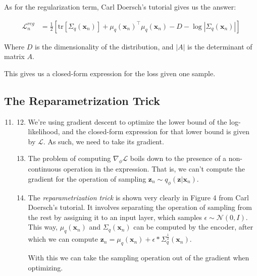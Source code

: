 \documentclass{article}
\begin{document}
\begin{enumerate}[label=\textbf{1.\arabic*}]
  As for the regularization term, Carl Doersch's tutorial gives us the answer:

  \begin{align*}
    \mathcal{L}_n^{reg} &= \frac{1}{2} \left[ \text{tr} \left[ \Sigma_q(\bm{x}_n) \right] + \mu_q(\bm{x}_n)^{\top} \mu_q(\bm{x}_n) - D - \log |\Sigma_q(\bm{x}_n)| \right]
  \end{align*}

  Where $D$ is the dimensionality of the distribution, and $|A|$ is the determinant of matrix $A$.

  This gives us a closed-form expression for the loss given one sample.
\end{enumerate}

\subsection{The Reparametrization Trick}

\begin{enumerate}[label=\textbf{1.\arabic*}]
  \setcounter{enumi}{10}
  \item

  \begin{enumerate}[label=(\alph*)]
    \setcounter{enumi}{11}
    \item
    We're using gradient descent to optimize the lower bound of the log-likelihood, and the closed-form expression for that lower bound is given by $\mathcal{L}$. As such, we need to take its gradient.

    \item
    The problem of computing $\nabla_{\phi} \mathcal{L}$ boils down to the presence of a non-continuous operation in the expression. That is, we can't compute the gradient for the operation of sampling $\bm{z}_n \sim q_{\phi}(\bm{z}|\bm{x}_n)$.

    \item
    The \textit{reparametrization trick} is shown very clearly in Figure 4 from Carl Doersch's tutorial. It involves separating the operation of sampling from the rest by assigning it to an input layer, which samples $\epsilon \sim \mathcal{N}(0, I)$. This way, $\mu_q(\bm{x}_n)$ and $\Sigma_q(\bm{x}_n)$ can be computed by the encoder, after which we can compute $\bm{z}_n = \mu_q(\bm{x}_n) + \epsilon * \Sigma_q^{\frac{1}{2}}(\bm{x}_n)$.

    With this we can take the sampling operation out of the gradient when optimizing.
  \end{enumerate}
\end{enumerate}
\end{document}
